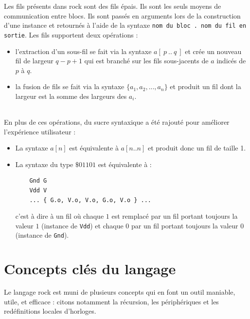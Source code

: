 \documentclass[13pt]{article}
\begin{document}
Les fils présents dans rock sont des fils épais. Ils sont les seuls moyens de
communication entre blocs. Ils sont passés en arguments lors de la construction
d'une instance et retournés à l'aide de la syntaxe \texttt{nom du bloc . nom du
  fil en sortie}.
Les fils supportent deux opérations :
\begin{itemize}
\item l'extraction d'un sous-fil se fait via la syntaxe $a[\ p\ ..\ q\ ]$ et crée
  un nouveau fil de largeur $q - p + 1$ qui est branché sur les fils sous-jacents
  de $a$ indicés de $p$ à $q$.
\item la fusion de fils se fait via la syntaxe $\{ a_1, a_2, ..., a_n \}$ et
  produit un fil dont la largeur est la somme des largeurs des $a_i$.
\end{itemize} 
\text{}\\
En plus de ces opérations, du sucre syntaxique a été rajouté pour améliorer
l'expérience utilisateur :
\begin{itemize}
\item La syntaxe $a[n]$ est équivalente à $a[n..n]$ et produit donc un fil de
  taille 1.
\item La syntaxe du type $\$01101$ est
  équivalente à :
\begin{verbatim}
    Gnd G
    Vdd V
    ... { G.o, V.o, V.o, G.o, V.o } ...
\end{verbatim}
  c'est à dire à un fil où chaque $1$ est remplacé par un fil portant toujours
  la valeur $1$ (instance de \texttt{Vdd}) et chaque $0$ par un fil portant
  toujours la valeur $0$ (instance de \texttt{Gnd}). 
\end{itemize}


\section{Concepts clés du langage}

Le langage rock est muni de plusieurs concepts qui en font un outil maniable,
utile, et efficace : citons notamment la récursion, les périphériques et les
redéfinitions locales d'horloges.
\end{document}
